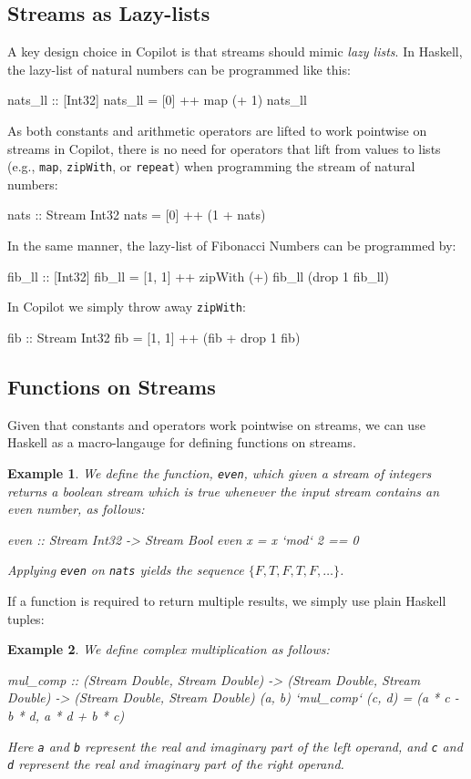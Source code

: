 \documentclass[a4paper, 10pt]{article}
\theoremstyle{example}
\newtheorem{example}{Example}%
\begin{document}
\subsection{Streams as Lazy-lists}

A key design choice in Copilot is that streams should mimic \emph{lazy lists}.
In Haskell, the lazy-list of natural numbers can be programmed like this:
%
\begin{code}
nats_ll :: [Int32]
nats_ll = [0] ++ map (+ 1) nats_ll
\end{code}
%
As both constants and arithmetic operators are lifted to work pointwise on
streams in Copilot, there is no need for operators that lift from values to
lists (e.g., {\tt map}, {\tt zipWith}, or {\tt repeat}) when
programming the stream of natural numbers:
%
\begin{code}
nats :: Stream Int32
nats = [0] ++ (1 + nats)
\end{code}
%
In the same manner, the lazy-list of Fibonacci Numbers can be programmed by:
%
\begin{code}
fib_ll :: [Int32]
fib_ll = [1, 1] ++ zipWith (+) fib_ll (drop 1 fib_ll)
\end{code}
%
In Copilot we simply throw away {\tt zipWith}:
\begin{code}
fib :: Stream Int32
fib = [1, 1] ++ (fib + drop 1 fib)
\end{code}

\subsection{Functions on Streams}

Given that constants and operators work pointwise on streams, we can use Haskell
as a macro-langauge for defining functions on streams.

\begin{example}
We define the function, {\tt even}, which given a stream of
integers returns a boolean stream which is true whenever the input stream
contains an even number, as follows:
%
\begin{code}
even :: Stream Int32 -> Stream Bool
even x = x `mod` 2 == 0
\end{code}
%
Applying {\tt even} on {\tt nats} yields the sequence
$\{F, T, F, T, F, \dots\}$.
\end{example}

If a function is required to return multiple results, we simply use plain
Haskell tuples:

\begin{example}
We define complex multiplication as follows:
%
\begin{code}
mul_comp
  :: (Stream Double, Stream Double)
  -> (Stream Double, Stream Double)
  -> (Stream Double, Stream Double)
(a, b) `mul_comp` (c, d) = (a * c - b * d, a * d + b * c)
\end{code}
%
Here {\tt a} and {\tt b} represent the real and imaginary part of the left
operand, and {\tt c} and {\tt d} represent the real and imaginary part
of the right operand.
\end{example}
\end{document}
